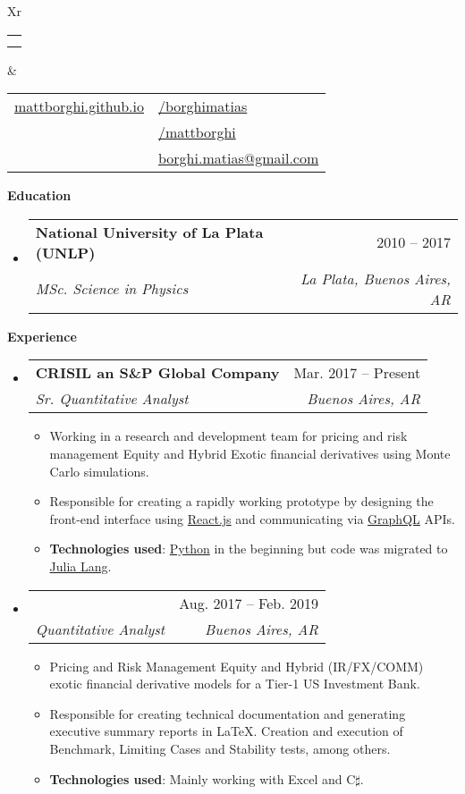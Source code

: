 \documentclass[letterpaper,12pt]{article}[leftmargin=*]
\makeatletter
\def \fullname {Matias Borghi}
\def \subtitle {}
\def \linkedinicon {\faLinkedin}
\def \linkedinlink {https://www.linkedin.com/in/borghimatias/}
\def \linkedintext {/borghimatias}
\def \phoneicon {\faPhone}
\def \phonetext {+54 9 11 2157 6504}
\def \emailicon {\faEnvelope}
\def \emaillink {mailto:borghi.matias@gmail.com}
\def \emailtext {borghi.matias@gmail.com}
\def \githubicon {\faGithub}
\def \githublink {https://github.com/mattborghi}
\def \githubtext {/mattborghi}
\def \websiteicon {\faGlobe}
\def \websitelink {https://mattborghi.github.io/}
\def \websitetext {mattborghi.github.io}
\def \headertype {\doublecol} %
\def \entryspacing {-0pt}
\def \linkedin {\linkedinicon \hspace{3pt}\href{\linkedinlink}{\linkedintext}}
\def \phone {\phoneicon \hspace{3pt}{ \phonetext}}
\def \email {\emailicon \hspace{3pt}\href{\emaillink}{\emailtext}}
\def \github {\githubicon \hspace{3pt}\href{\githublink}{\githubtext}}
\def \website {\websiteicon \hspace{3pt}\href{\websitelink}{\websitetext}}
\renewcommand{\section}[2]{\vspace{5pt}
  \colorbox{secondary}{\color{white}\raggedbottom\normalsize\textbf{{#1}{\hspace{7pt}#2}}}
}
\newcommand{\resumeEntryStart}{\begin{itemize}[leftmargin=2.5mm]}
\newcommand{\resumeEntryEnd}{\end{itemize}\vspace{\entryspacing}}
\newcommand{\resumeItemListStart}{\begin{itemize}[leftmargin=4.5mm]}
\newcommand{\resumeItemListEnd}{\end{itemize}}
\newcommand{\resumeItem}[1]{
  \item\small{
    {#1 \vspace{-2pt}}
  }
}
\newcommand{\resumeEntryTSDL}[4]{
  \vspace{-1pt}\item[]
    \begin{tabularx}{0.97\textwidth}{X@{\hspace{60pt}}r}
      \textbf{\color{primary}#1} & {\firabook\color{accent}\small#2} \\
      \textit{\color{accent}\small#3} & \textit{\color{accent}\small#4} \\
    \end{tabularx}\vspace{-6pt}
}
\newcommand{\doublecol}[6]{
  \begin{tabularx}{\textwidth}{Xr}
    {
      \begin{tabular}[c]{l}
        \fontsize{35}{45}\selectfont{\color{primary}{{\textbf{\fullname}}}} \\
        {\textit{\subtitle}} %
      \end{tabular}
    } & {
      \begin{tabular}[c]{l@{\hspace{1.5em}}l}
        {\small#4} & {\small#1} \\
        {\small#5} & {\small#2} \\
        {\small#6} & {\small#3}
      \end{tabular}
    }
  \end{tabularx}
}
\newcommand{\singlecol}[6]{
  \begin{tabularx}{\textwidth}{Xr}
    {
      \begin{tabular}[b]{l}
        \fontsize{35}{45}\selectfont{\color{primary}{{\textbf{\fullname}}}} \\
        {\textit{\subtitle}} %
      \end{tabular}
    } & {
      \begin{tabular}[c]{l}
        {\small#1} \\
        {\small#2} \\
        {\small#3} \\
        {\small#4} \\
        {\small#5} \\
        {\small#6}
      \end{tabular}
    }
  \end{tabularx}
}
\makeatother
\begin{document}


\headertype{\linkedin}{\github}{\email}{\website}{\phone}{} %
\vspace{-10pt} %

\section{\faGraduationCap}{Education}

  \resumeEntryStart
    \resumeEntryTSDL
      {National University of La Plata (UNLP) \href{https://unlp.edu.ar/}{\faGlobe}}{2010 -- 2017}
      {MSc. Science in Physics}{La Plata, Buenos Aires, AR}
  \resumeEntryEnd

\section{\faPieChart}{Experience}

  \resumeEntryStart
    \resumeEntryTSDL
      {CRISIL an {\color{red}S\&P Global} Company \href{https://www.crisil.com/}{\faGlobe}}{Mar. 2017 -- Present}
      {Sr. Quantitative Analyst}{Buenos Aires, AR}
    \resumeItemListStart
      \resumeItem {Working in a research and development team for pricing and risk management Equity and Hybrid Exotic financial derivatives using Monte Carlo simulations.}
      \resumeItem {Responsible for creating a rapidly working prototype by designing the front-end interface using \href{https://reactjs.org/}{React.js} and communicating via \href{https://graphql.org/}{GraphQL} APIs.}
      \resumeItem {\textbf{Technologies used}: \href{https://www.python.org/}{Python} in the beginning but code was migrated to \href{https://julialang.org/}{Julia Lang}.}
     \resumeItemListEnd
  \resumeEntryEnd
  
  \resumeEntryStart
  \resumeEntryTSDL
      {}{Aug. 2017 -- Feb. 2019}
      {Quantitative Analyst}{Buenos Aires, AR}
    \resumeItemListStart
      \resumeItem {Pricing and Risk Management Equity and Hybrid (IR/FX/COMM) exotic financial derivative models for a Tier-1 US Investment Bank.}
      \resumeItem {Responsible for creating technical documentation and generating executive summary reports in \LaTeX. Creation and execution of Benchmark, Limiting Cases and Stability tests, among others.}
      \resumeItem {\textbf{Technologies used}: Mainly working with Excel and C$\sharp$.}
    \resumeItemListEnd
  \resumeEntryEnd
\end{document}
